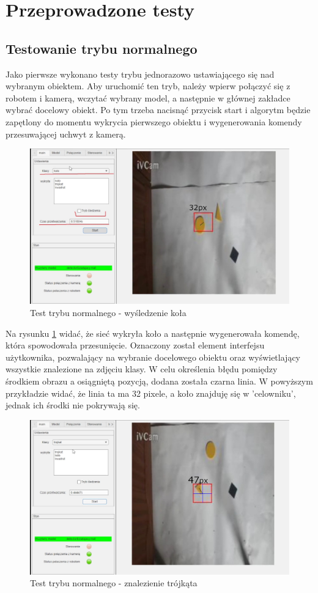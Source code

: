 \section{Przeprowadzone testy}
\subsection{Testowanie trybu normalnego}
Jako pierwsze wykonano testy trybu jednorazowo ustawiającego się nad wybranym obiektem. Aby uruchomić ten tryb, należy wpierw 
połączyć się z robotem i kamerą, wczytać wybrany model, a następnie w głównej zakładce wybrać docelowy obiekt. 
Po tym trzeba nacisnąć przycisk start i algorytm będzie zapętlony do momentu wykrycia pierwszego obiektu i wygenerowania komendy 
przesuwającej uchwyt z kamerą. 
\begin{figure}[H]
	\centering
	\includegraphics[width=14cm]{pages/testy/img/test1_1.jpg}
	\caption{Test trybu normalnego - wyśledzenie koła}
	\label{rys:testTrybuNormalnego1}
\end{figure}
Na rysunku \ref{rys:testTrybuNormalnego1} widać, że sieć wykryła koło a następnie wygenerowała komendę, która spowodowała przesunięcie. 
Oznaczony został element interfejsu użytkownika, pozwalający na wybranie docelowego obiektu oraz wyświetlający wszystkie znalezione na zdjęciu klasy.
W celu określenia błędu pomiędzy środkiem obrazu a osiągniętą pozycją, dodana została czarna linia. W powyższym przykładzie widać, 
że linia ta ma 32 pixele, a koło znajduję się w 'celowniku', jednak ich środki nie pokrywają się.
\begin{figure}[H]
	\centering
	\includegraphics[width=14cm]{pages/testy/img/test1_2.jpg}
	\caption{Test trybu normalnego - znalezienie trójkąta}
\end{figure}
